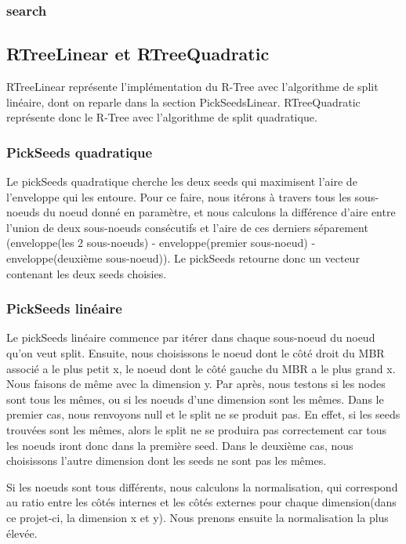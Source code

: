 \documentclass[utf8]{article}
\begin{document}
\begin{large}
  \par
  \subsubsection{search}
  \par
  \indent


  \par
  \subsection{RTreeLinear et RTreeQuadratic}\label{RTreeLinear}
  \par
  \indent
  RTreeLinear représente l'implémentation du R-Tree avec l'algorithme de split
  linéaire, dont on reparle dans la section PickSeedsLinear. RTreeQuadratic
  représente donc le R-Tree avec l'algorithme de split quadratique.

  \subsubsection{PickSeeds quadratique}
  Le pickSeeds quadratique cherche les deux seeds qui maximisent l'aire de l'enveloppe qui les entoure.
  \newline Pour ce faire, nous itérons à travers tous les sous-noeuds du noeud donné en paramètre, 
  et nous calculons la différence d'aire entre l'union de deux sous-noeuds consécutifs et l'aire de 
  ces derniers séparement (enveloppe(les 2 sous-noeuds) - enveloppe(premier sous-noeud) - enveloppe(deuxième sous-noeud)).
  \newline Le pickSeeds retourne donc un vecteur contenant les deux seeds choisies.
  \subsubsection{PickSeeds linéaire}
  \par
  \indent
  Le pickSeeds linéaire commence par itérer dans chaque sous-noeud du noeud
  qu'on veut split. Ensuite, nous choisissons le noeud dont le côté droit du MBR
  associé a le plus petit x, le noeud dont le côté gauche du MBR a le plus grand
  x. Nous faisons de même avec la dimension y. Par après, nous testons si les
  nodes sont tous les mêmes, ou si les noeuds d'une dimension sont les mêmes.
  Dans le premier cas, nous renvoyons null et le split ne se produit pas. En
  effet, si les seeds trouvées sont les mêmes, alors le split ne se produira pas
  correctement car tous les noeuds iront donc dans la première seed. Dans le
  deuxième cas, nous choisissons l'autre dimension dont les seeds ne sont pas
  les mêmes.
  \par
  \indent
  Si les noeuds sont tous différents, nous calculons la normalisation, qui
  correspond au ratio entre les côtés internes et les côtés externes pour chaque
  dimension(dans ce projet-ci, la dimension x et y). Nous prenons ensuite la
  normalisation la plus élevée.
  \par


\end{large}
\end{document}

